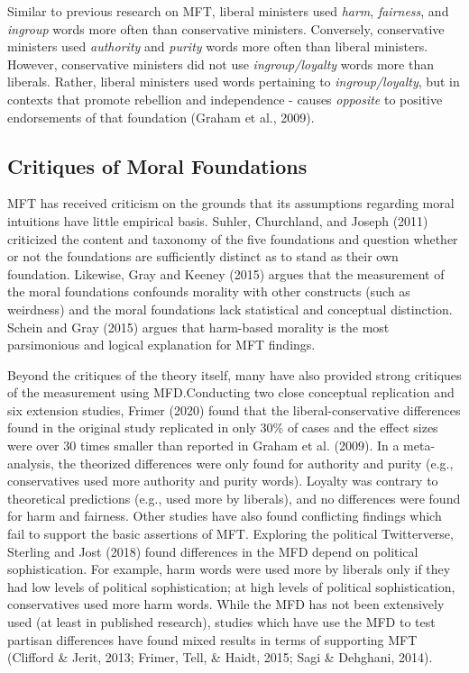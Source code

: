 \documentclass[
  english,
  man]{apa6}
\begin{document}
Similar to previous research on MFT, liberal ministers used \emph{harm}, \emph{fairness}, and \emph{ingroup} words more often than conservative ministers. Conversely, conservative ministers used \emph{authority} and \emph{purity} words more often than liberal ministers. However, conservative ministers did not use \emph{ingroup/loyalty} words more than liberals. Rather, liberal ministers used words pertaining to \emph{ingroup/loyalty}, but in contexts that promote rebellion and independence - causes \emph{opposite} to positive endorsements of that foundation (Graham et al., 2009).

\hypertarget{critiques-of-moral-foundations}{%
\subsection{Critiques of Moral Foundations}\label{critiques-of-moral-foundations}}

MFT has received criticism on the grounds that its assumptions regarding moral intuitions have little empirical basis. Suhler, Churchland, and Joseph (2011) criticized the content and taxonomy of the five foundations and question whether or not the foundations are sufficiently distinct as to stand as their own foundation. Likewise, Gray and Keeney (2015) argues that the measurement of the moral foundations confounds morality with other constructs (such as weirdness) and the moral foundations lack statistical and conceptual distinction. Schein and Gray (2015) argues that harm-based morality is the most parsimonious and logical explanation for MFT findings.

Beyond the critiques of the theory itself, many have also provided strong critiques of the measurement using MFD.Conducting two close conceptual replication and six extension studies, Frimer (2020) found that the liberal-conservative differences found in the original study replicated in only 30\% of cases and the effect sizes were over 30 times smaller than reported in Graham et al. (2009). In a meta-analysis, the theorized differences were only found for authority and purity (e.g., conservatives used more authority and purity words). Loyalty was contrary to theoretical predictions (e.g., used more by liberals), and no differences were found for harm and fairness. Other studies have also found conflicting findings which fail to support the basic assertions of MFT. Exploring the political Twitterverse, Sterling and Jost (2018) found differences in the MFD depend on political sophistication. For example, harm words were used more by liberals only if they had low levels of political sophistication; at high levels of political sophistication, conservatives used more harm words. While the MFD has not been extensively used (at least in published research), studies which have use the MFD to test partisan differences have found mixed results in terms of supporting MFT (Clifford \& Jerit, 2013; Frimer, Tell, \& Haidt, 2015; Sagi \& Dehghani, 2014).
\end{document}
